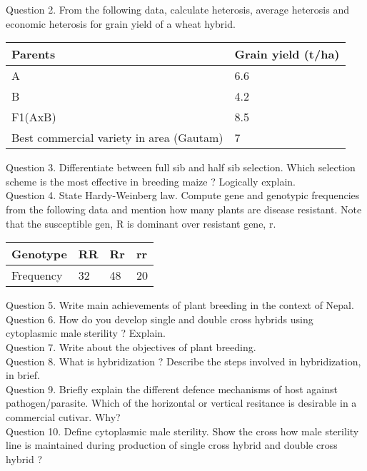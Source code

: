 \documentclass[12pt]{article}\usepackage[]{graphicx}\usepackage[]{color}
\begin{document}
Question 2. From the following data, calculate heterosis, average heterosis and economic heterosis for grain yield of a wheat hybrid.\\ 
\begin{table}[H]
\centering\begingroup\fontsize{8}{10}\selectfont

\begin{tabular}[t]{ll}
\toprule
Parents & Grain yield (t/ha)\\
\midrule
A & 6.6\\
B & 4.2\\
F1(AxB) & 8.5\\
Best commercial variety in area (Gautam) & 7\\
\bottomrule
\end{tabular}
\endgroup{}
\end{table}
Question 3. Differentiate between full sib and half sib selection. Which selection scheme is the most effective in breeding maize ? Logically explain.\\
Question 4. State Hardy-Weinberg law. Compute gene and genotypic frequencies from the following data and mention how many plants are disease resistant. Note that the susceptible gen, R is dominant over resistant gene, r.\\ 
\begin{table}[H]
\centering\begingroup\fontsize{8}{10}\selectfont

\begin{tabular}[t]{llll}
\toprule
Genotype & RR & Rr & rr\\
\midrule
Frequency & 32 & 48 & 20\\
\bottomrule
\end{tabular}
\endgroup{}
\end{table}
Question 5. Write main achievements of plant breeding in the context of Nepal.\\
Question 6. How do you develop single and double cross hybrids using cytoplasmic male sterility ? Explain.\\
Question 7. Write about the objectives of plant breeding.\\
Question 8. What is hybridization ? Describe the steps involved in hybridization, in brief.\\
Question 9. Briefly explain the different defence mechanisms of host against pathogen/parasite. Which of the horizontal or vertical resitance is desirable in a commercial cutivar. Why?\\
Question 10. Define cytoplasmic male sterility. Show the cross how male sterility line is maintained during production of single cross hybrid and double cross hybrid ?\\
\end{document}
